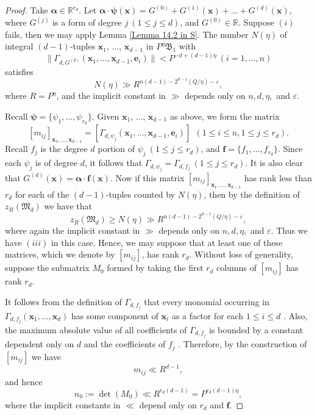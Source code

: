 \documentclass[12pt]{amsart}
\theoremstyle{definition}
\theoremstyle{remark}
\numberwithin{equation}{section}
\begin{document}
\begin{proof}
Take $\boldsymbol{\alpha} \in \mathbb{R}^{r_d}$. Let
$\boldsymbol{\alpha} \cdot \boldsymbol{\psi}(\mathbf{x}) = G^{(0)}+ G^{(1)}(\mathbf{x}) + ... +  G^{(d)}(\mathbf{x})$, where
$G^{(j)}$ is a form of degree $j \ (1 \leq  j \leq d)$, and $G^{(0)} \in \mathbb{R}$.
Suppose $(i)$ fails, then we may apply Lemma \ref{Lemma 14.2 in S}. The number
$N(\eta)$ of integral $(d-1)$-tuples $\mathbf{x}_1$, ..., $\mathbf{x}_{d-1}$ in $P^{\eta} \mathfrak{B}_1$ with
\begin{equation}
\label{(15.2) in S}
\|   \Gamma_{d, G^{(d)}} ( \mathbf{x}_1, ... , \mathbf{x}_{d-1}, \mathbf{e}_i  ) \| < P^{-d + (d-1) \eta } \ (i=1,..., n)
\end{equation}
satisfies
$$
N(\eta) \gg R^{n(d-1) - 2^{d-1} (Q/ \eta) - \varepsilon },
$$
where $R = P^{\eta}$, and  the implicit constant in $\gg$ depends only on $n,d, \eta,$ and $\varepsilon$.

Recall $\boldsymbol{\psi} = \{ \psi_1, ...,  \psi_{r_d} \}$. Given $\mathbf{x}_1$, ..., $\mathbf{x}_{d-1}$
as above, we form the matrix
$$
[m_{ij}]_{\mathbf{x}_1, ... , \mathbf{x}_{d-1}} = [ \Gamma_{ d, \psi_j } ( \mathbf{x}_1, ..., \mathbf{x}_{d-1}, \mathbf{e}_i  ) ]
  \  \  (1 \leq i \leq n, 1 \leq j \leq r_d).
$$
Recall $f_j$ is the degree $d$ portion of $\psi_j \ (1 \leq j \leq r_d)$, and
$\mathbf{f}= \{ f_1, ...,  f_{r_d} \}$.
Since each $\psi_j$ is of degree $d$, it follows that $\Gamma_{d, \psi_j} = \Gamma_{d, f_j} \  (1 \leq j \leq r_d)$.
It is also clear that $G^{(d)}( \mathbf{x} ) = \boldsymbol{\alpha} \cdot \mathbf{f}(\mathbf{x})$.
Now if this matrix $[m_{ij}]_{\mathbf{x}_1, ... , \mathbf{x}_{d-1}}$ has rank less than $r_d$ for each of the $(d-1)$-tuples counted by $N(\eta)$, then by the definition of
$z_R(\mathfrak{M}_d)$ we have that
$$
z_R(\mathfrak{M}_d) \geq N(\eta) \gg R^{n(d-1) - 2^{d-1} (Q/ \eta) - \varepsilon },
$$
where again the implicit constant in $\gg$ depends only on $n,d, \eta,$ and $\varepsilon$.
Thus we have $(iii)$ in this case. Hence, we may suppose that at least one of these matrices, which we denote by $[m_{ij}]$, has rank $r_d$.
Without loss of generality, suppose the submatrix $M_0$ formed by taking the first $r_d$ columns of $[m_{ij}]$
has rank $r_d$. 

It follows from the definition of $\Gamma_{d, f_j}$ that every monomial occurring in
$\Gamma_{d, f_j} (\mathbf{x}_1, ..., \mathbf{x}_d)$ has some component of $\mathbf{x}_i$ as a factor for each $1 \leq i \leq d$ \cite[Proof of Lemma 11.2]{S}.
Also, the maximum absolute value of all coefficients of
$\Gamma_{d, f_j}$ is bounded by a constant dependent only on $d$ and the coefficients of $f_j$ \cite[Lemma 11.3]{S}.
Therefore, by the construction of $[m_{ij}]$ we have
$$
m_{ij} \ll R^{d-1},
$$
and hence
$$
n_0 := \det (M_0) \ll R^{r_d(d-1)} = P^{r_d(d-1)\eta},
$$
where the implicit constants in $\ll$ depend only on $r_d$ and $\mathbf{f}$.


\end{proof}
\end{document}
